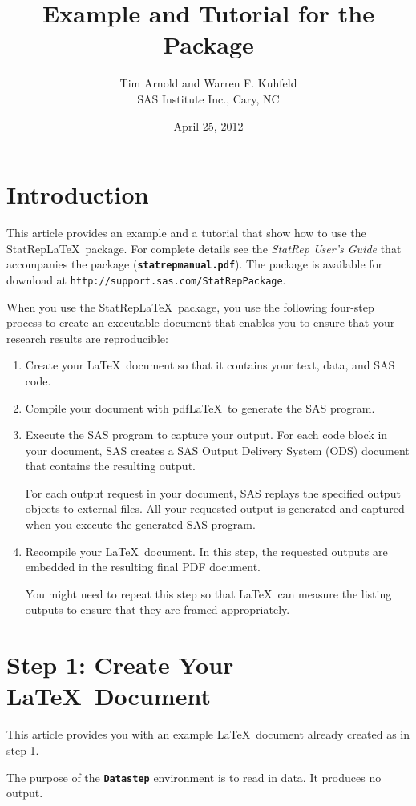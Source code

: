 \documentclass{article}
\title{Example and Tutorial for the \Statrep Package}
\author{Tim Arnold and Warren F. Kuhfeld\\SAS Institute Inc., Cary, NC}
\date{April 25, 2012}
\newcommand*{\Statrep}{\mbox{\textsf{StatRep}}\xspace}
\newcommand*{\Code}[1]{\texttt{\textbf{#1}}}
\begin{document}
\maketitle
\section{Introduction}
This article provides an example and a
tutorial that show how to use the \Statrep \LaTeX\ package.
For complete details
see the \emph{\Statrep User's Guide} that accompanies the
package (\Code{statrepmanual.pdf}). The package is available
for download at \texttt{http://support.sas.com/StatRepPackage}.

When you use the \Statrep \LaTeX\ package, you use the following
four-step process to create an executable document that
enables you to ensure that your research results are reproducible:
\begin{enumerate}
\item Create your \LaTeX\ document so that it contains your text,
data, and SAS code.

\item Compile your document with pdf\LaTeX\ to generate the SAS
program.

\item Execute the SAS program to capture your output. For each
code block in your document, SAS creates a SAS Output Delivery System (ODS)
document that contains the resulting output.

For each output request in your document, SAS replays the
specified output objects to external files. All your
requested output is generated and captured when you execute
the generated SAS program.

\item Recompile your \LaTeX\ document. In this step, the
requested outputs are embedded in the resulting final PDF document.

You might need to repeat this step so that \LaTeX\ can measure the
listing outputs to ensure that they are framed appropriately.
\end{enumerate}

\section{Step 1: Create Your \LaTeX\ Document}
This article provides you with an example \LaTeX\ document
already created as in step 1.

The purpose of the \Code{Datastep} environment is to read in data.
It produces no output.
\end{document}
